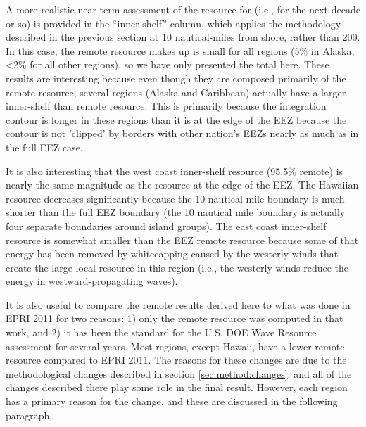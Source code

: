 A more realistic near-term assessment of the resource for (i.e., for the next decade or so) is provided in the ``inner shelf'' column, which applies the methodology described in the previous section at 10 nautical-miles from shore, rather than 200. In this case, the remote resource makes up is small for all regions (5\% in Alaska, <2\% for all other regions), so we have only presented the total here. These results are interesting because even though they are composed primarily of the remote resource, several regions (Alaska and Caribbean) actually have a larger inner-shelf than remote resource. This is primarily because the integration contour is longer in these regions than it is at the edge of the EEZ because the contour is not 'clipped' by borders with other nation's EEZs nearly as much as in the full EEZ case.

It is also interesting that the west coast inner-shelf resource (95.5\% remote) is nearly the same magnitude as the resource at the edge of the EEZ. 
 The Hawaiian resource decreases significantly because the 10 nautical-mile boundary is much shorter than the full EEZ boundary (the 10 nautical mile boundary is actually four separate boundaries around island groups). The east coast inner-shelf resource is somewhat smaller than the EEZ remote resource because some of that energy has been removed by whitecapping caused by the westerly winds that create the large local resource in this region (i.e., the westerly winds reduce the energy in westward-propagating waves).

It is also useful to compare the remote results derived here to what was done in EPRI 2011 for two reasons: 1) only the remote resource was computed in that work, and 2) it has been the standard for the U.S. DOE Wave Resource assessment for several years. 
Most regions, except Hawaii, have a lower remote resource compared to EPRI 2011. The reasons for these changes are due to the methodological changes described in section \ref{sec:method:changes}, and all of the changes described there play some role in the final result. However, each region has a {primary \em} reason for the change, and these are discussed in the following paragraph.

